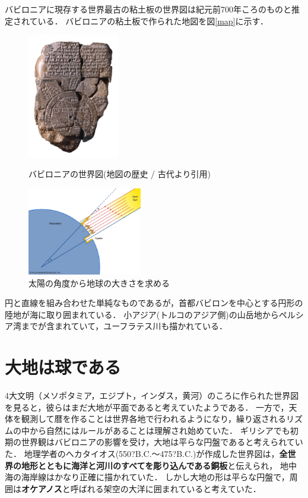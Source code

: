 \documentclass[titlepage,a4paper]{jsarticle}
\begin{document}
バビロニアに現存する世界最古の粘土板の世界図は紀元前700年ころのものと推定されている．
バビロニアの粘土板で作られた地図を図\ref{map}に示す．
\begin{figure}[t]
      \centering
      \begin{minipage}[]{0.45\hsize}
            \centering
            \includegraphics[width=4cm]{img/babironia.jpg}
            \caption{バビロニアの世界図(地図の歴史 / 古代より引用)}
            \label{map}
      \end{minipage}
      \begin{minipage}[]{0.45\hsize}
            \centering
            \includegraphics[width=5cm]{img/hidokei.jpeg}
            \caption{太陽の角度から地球の大きさを求める}
            \label{hidokeii}
      \end{minipage}
\end{figure}
円と直線を組み合わせた単純なものであるが，首都バビロンを中心とする円形の陸地が海に取り囲まれている．
小アジア(トルコのアジア側)の山岳地からペルシア湾までが含まれていて，ユーフラテス川も描かれている．

\section{大地は球である}
4大文明（メソポタミア，エジプト，インダス，黄河）のころに作られた世界図を見ると，彼らはまだ大地が平面であると考えていたようである．
一方で，天体を観測して暦を作ることは世界各地で行われるようになり，繰り返されるリズムの中から自然にはルールがあることは理解され始めていた．
ギリシアでも初期の世界観はバビロニアの影響を受け，大地は平らな円盤であると考えられていた．
地理学者のへカタイオス(550?B.C.～475?B.C.)が作成した世界図は，\textbf{全世界の地形とともに海洋と河川のすべてを彫り込んである銅板}と伝えられ，
地中海の海岸線はかなり正確に描かれていた．
しかし大地の形は平らな円盤で，周囲は\textbf{オケアノス}と呼ばれる架空の大洋に囲まれていると考えていた．
\end{document}
